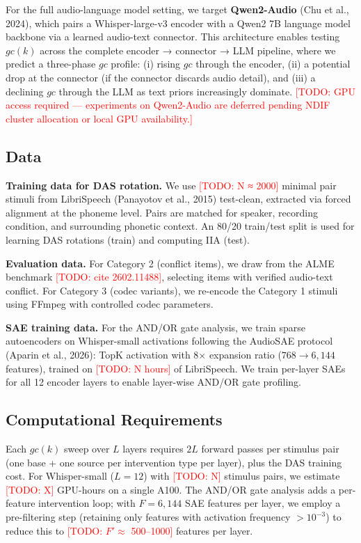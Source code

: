 \documentclass[a4paper]{article}
\begin{document}
For the full audio-language model setting, we target \textbf{Qwen2-Audio} (Chu et al., 2024), which pairs a Whisper-large-v3 encoder with a Qwen2 7B language model backbone via a learned audio-text connector. This architecture enables testing $gc(k)$ across the complete encoder → connector → LLM pipeline, where we predict a three-phase $gc$ profile: (i) rising $gc$ through the encoder, (ii) a potential drop at the connector (if the connector discards audio detail), and (iii) a declining $gc$ through the LLM as text priors increasingly dominate. \textcolor{red}{[TODO: GPU access required — experiments on Qwen2-Audio are deferred pending NDIF cluster allocation or local GPU availability.]}

\subsection{Data}

\textbf{Training data for DAS rotation.} We use \textcolor{red}{[TODO: N ≈ 2000]} minimal pair stimuli from LibriSpeech (Panayotov et al., 2015) test-clean, extracted via forced alignment at the phoneme level. Pairs are matched for speaker, recording condition, and surrounding phonetic context. An 80/20 train/test split is used for learning DAS rotations (train) and computing IIA (test).

\textbf{Evaluation data.} For Category 2 (conflict items), we draw from the ALME benchmark \textcolor{red}{[TODO: cite 2602.11488]}, selecting items with verified audio-text conflict. For Category 3 (codec variants), we re-encode the Category 1 stimuli using FFmpeg with controlled codec parameters.

\textbf{SAE training data.} For the AND/OR gate analysis, we train sparse autoencoders on Whisper-small activations following the AudioSAE protocol (Aparin et al., 2026): TopK activation with 8× expansion ratio ($768 \rightarrow 6{,}144$ features), trained on \textcolor{red}{[TODO: N hours]} of LibriSpeech. We train per-layer SAEs for all 12 encoder layers to enable layer-wise AND/OR gate profiling.

\subsection{Computational Requirements}

Each $gc(k)$ sweep over $L$ layers requires $2L$ forward passes per stimulus pair (one base + one source per intervention type per layer), plus the DAS training cost. For Whisper-small ($L = 12$) with \textcolor{red}{[TODO: N]} stimulus pairs, we estimate \textcolor{red}{[TODO: X]} GPU-hours on a single A100. The AND/OR gate analysis adds a per-feature intervention loop; with $F = 6{,}144$ SAE features per layer, we employ a pre-filtering step (retaining only features with activation frequency $> 10^{-3}$) to reduce this to \textcolor{red}{[TODO: $F' \approx$ 500–1000]} features per layer.
\end{document}
